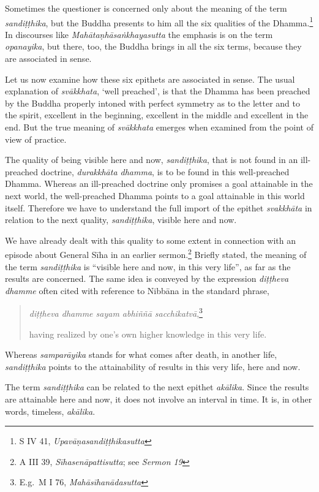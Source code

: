 Sometimes the questioner is concerned only about the meaning of the term \emph{sandiṭṭhika}, but the Buddha presents to him all the six qualities of the Dhamma.\footnote{S IV 41, \emph{Upavāṇasandiṭṭhikasutta}} In discourses like \emph{Mahātaṇhāsaṅkhayasutta} the emphasis is on the term \emph{opanayika}, but there, too, the Buddha brings in all the six terms, because they are associated in sense.

Let us now examine how these six epithets are associated in sense. The usual explanation of \emph{svākkhata}, `well preached', is that the Dhamma has been preached by the Buddha properly intoned with perfect symmetry as to the letter and to the spirit, excellent in the beginning, excellent in the middle and excellent in the end. But the true meaning of \emph{svākkhata} emerges when examined from the point of view of practice.

The quality of being visible here and now, \emph{sandiṭṭhika}, that is not found in an ill-preached doctrine, \emph{durakkhāta dhamma}, is to be found in this well-preached Dhamma. Whereas an ill-preached doctrine only promises a goal attainable in the next world, the well-preached Dhamma points to a goal attainable in this world itself. Therefore we have to understand the full import of the epithet \emph{svakkhāta} in relation to the next quality, \emph{sandiṭṭhika}, visible here and now.

We have already dealt with this quality to some extent in connection with an episode about General Sīha in an earlier sermon.\footnote{A III 39, \emph{Sīhasenāpattisutta}; see \emph{Sermon 19}} Briefly stated, the meaning of the term \emph{sandiṭṭhika} is ``visible here and now, in this very life'', as far as the results are concerned. The same idea is conveyed by the expression \emph{diṭṭheva dhamme} often cited with reference to Nibbāna in the standard phrase,

\begin{quote}
\emph{diṭṭheva dhamme sayam abhiññā sacchikatvā},\footnote{E.g.~M I 76, \emph{Mahāsīhanādasutta}}

having realized by one's own higher knowledge in this very life.
\end{quote}

Whereas \emph{samparāyika} stands for what comes after death, in another life, \emph{sandiṭṭhika} points to the attainability of results in this very life, here and now.

The term \emph{sandiṭṭhika} can be related to the next epithet \emph{akālika}. Since the results are attainable here and now, it does not involve an interval in time. It is, in other words, timeless, \emph{akālika}.

